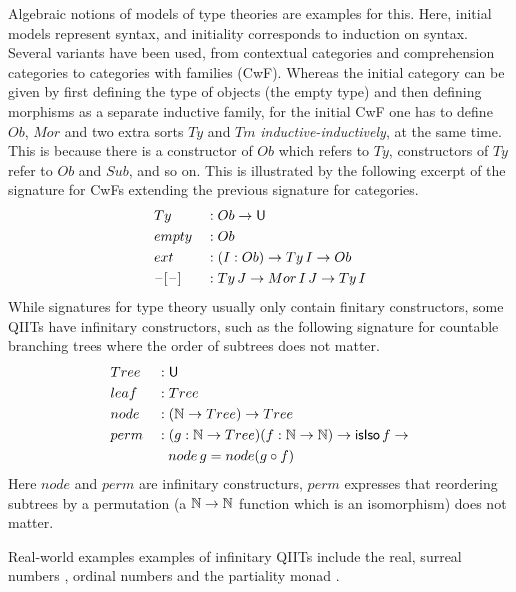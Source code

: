 \documentclass[sigplan,review,anonymous]{acmart}\settopmatter{printfolios=true,printccs=false,printacmref=false}
\begin{document}
Algebraic notions of models of type theories are examples for this. Here,
initial models represent syntax, and initiality corresponds to induction on
syntax. Several variants have been used, from contextual categories \cite{gat}
and comprehension categories \cite{jacobs1993comprehension} to categories with
families \cite{Dybjer96internaltype} (CwF).
%
Whereas the initial category can be given by first defining the type
of objects (the empty type) and then defining morphisms as a separate
inductive family, for the initial CwF one has to define $Ob$, $Mor$
and two extra sorts $Ty$ and $Tm$ \emph{inductive-inductively}, at the
same time. This is because there is a constructor of $Ob$ which refers
to $Ty$, constructors of $Ty$ refer to $Ob$ and $Sub$, and so on. This
is illustrated by the following excerpt of the signature for CwFs
extending the previous signature for categories.
\begin{alignat*}{3}
  & Ty && : Ob\rightarrow \mathsf{U} \\
  & empty  && : Ob \\
  & ext && : (I:Ob)\rightarrow Ty\,I\rightarrow Ob \\
  & \mathord{\hspace{1pt}\text{--}\hspace{1pt}}[\mathord{\hspace{1pt}\text{--}\hspace{1pt}}] && : Ty\,J\rightarrow Mor\,I\,J\rightarrow Ty\,I
\end{alignat*}
While signatures for type theory usually only contain finitary constructors,
some QIITs have infinitary constructors, such as the following signature for
countable branching trees where the order of subtrees does not matter.
\begin{alignat*}{3}
  & Tree && : \mathsf{U} \\
  & leaf  && : Tree \\
  & node && : (\mathbb{N}\rightarrow Tree)\rightarrow Tree \\
  & perm && : (g :\mathbb{N}\rightarrow Tree)(f : \mathbb{N}\rightarrow\mathbb{N})\rightarrow \mathsf{isIso}\,f\rightarrow \\
  & && \hspace{0.8em} node\,g = node (g\circ f)
\end{alignat*}
Here $node$ and $perm$ are infinitary constructurs, $perm$ expresses
that reordering subtrees by a permutation (a $\mathbb{N}\rightarrow\mathbb{N}$ function which
is an isomorphism) does not matter.

Real-world examples examples of infinitary QIITs include the real, surreal numbers \cite{HoTTbook}, ordinal numbers \cite{lumsdaineShulman} and the partiality monad \cite{partiality}.
\end{document}
